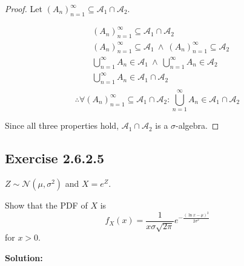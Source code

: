 \documentclass{article}
\begin{document}
\begin{proof}
Let \((A_n)_{n=1}^\infty\subseteq \mathcal{A}_1\cap \mathcal{A}_2\).

\begin{align*}
    & (A_n)_{n=1}^\infty\subseteq \mathcal{A}_1\cap \mathcal{A}_2 \\
    & (A_n)_{n=1}^\infty\subseteq \mathcal{A}_1\ \wedge\ (A_n)_{n=1}^\infty\subseteq \mathcal{A}_2 \\
    & \bigcup_{n=1}^\infty A_n \in \mathcal{A}_1\ \wedge\ \bigcup_{n=1}^\infty A_n \in \mathcal{A}_2 \\
    & \bigcup_{n=1}^\infty A_n \in \mathcal{A}_1\cap\mathcal{A}_2 \\
\end{align*}
\[\therefore \forall (A_n)_{n=1}^\infty \subseteq \mathcal{A}_1\cap\mathcal{A}_2: \bigcup_{n=1}^\infty A_n\in \mathcal{A}_1\cap \mathcal{A_2}\]

Since all three properties hold, \(\mathcal{A}_1\cap\mathcal{A}_2\) is a \(\sigma\)-algebra.
\end{proof}

\subsection{Exercise 2.6.2.5}

\(Z\sim \mathcal{N}(\mu, \sigma^2)\)
and \(X=e^Z\).

Show that the PDF of \(X\) is
\[f_X(x)=\frac{1}{x\sigma\sqrt{2\pi}}e^{-\frac{(\ln x-\mu)^2}{2\sigma^2}}\]
for \(x>0\).

\textbf{Solution:}
\end{document}
